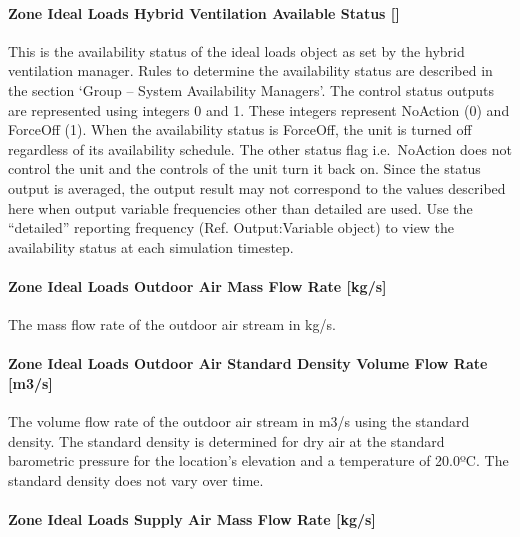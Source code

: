 \paragraph{Zone Ideal Loads Hybrid Ventilation Available Status {[]}}\label{zone-ideal-loads-hybrid-ventilation-available-status}

This is the availability status of the ideal loads object as set by the hybrid ventilation manager. Rules to determine the availability status are described in the section `Group -- System Availability Managers'. The control status outputs are represented using integers 0 and 1. These integers represent NoAction (0) and ForceOff (1). When the availability status is ForceOff, the unit is turned off regardless of its availability schedule. The other status flag i.e.~NoAction does not control the unit and the controls of the unit turn it back on. Since the status output is averaged, the output result may not correspond to the values described here when output variable frequencies other than detailed are used. Use the ``detailed'' reporting frequency (Ref. Output:Variable object) to view the availability status at each simulation timestep.

\paragraph{Zone Ideal Loads Outdoor Air Mass Flow Rate {[}kg/s{]}}\label{zone-ideal-loads-outdoor-air-mass-flow-rate-kgs}

The mass flow rate of the outdoor air stream in kg/s.

\paragraph{Zone Ideal Loads Outdoor Air Standard Density Volume Flow Rate {[}m3/s{]}}\label{zone-ideal-loads-outdoor-air-standard-density-volume-flow-rate-m3s}

The volume flow rate of the outdoor air stream in m3/s using the standard density. The standard density is determined for dry air at the standard barometric pressure for the location's elevation and a temperature of 20.0ºC. The standard density does not vary over time.

\paragraph{Zone Ideal Loads Supply Air Mass Flow Rate {[}kg/s{]}}\label{zone-ideal-loads-supply-air-mass-flow-rate-kgs}


